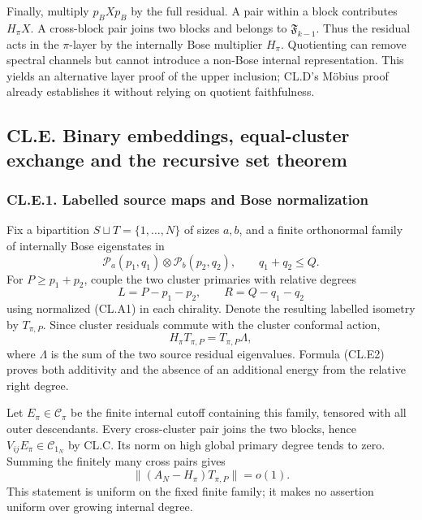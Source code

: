 \documentclass[a4paper,11pt]{article}
\numberwithin{equation}{section}
\begin{document}
Finally, multiply \(p_BXp_B\) by the full residual. A pair within a block contributes \(H_\pi X\). A cross-block pair joins two blocks and belongs to \(\mathfrak F_{k-1}\). Thus the residual acts in the \(\pi\)-layer by the internally Bose multiplier \(H_\pi\). Quotienting can remove spectral channels but cannot introduce a non-Bose internal representation. This yields an alternative layer proof of the upper inclusion; CL.D's Möbius proof already establishes it without relying on quotient faithfulness.

\hypertarget{cl.e.-binary-embeddings-equal-cluster-exchange-and-the-recursive-set-theorem}{%
\subsection{CL.E. Binary embeddings, equal-cluster exchange and the recursive set theorem}\label{cl.e.-binary-embeddings-equal-cluster-exchange-and-the-recursive-set-theorem}}

\hypertarget{cl.e.1.-labelled-source-maps-and-bose-normalization}{%
\subsubsection{CL.E.1. Labelled source maps and Bose normalization}\label{cl.e.1.-labelled-source-maps-and-bose-normalization}}

Fix a bipartition \(S\sqcup T=\{1,\ldots,N\}\) of sizes \(a,b\), and a finite orthonormal family of internally Bose eigenstates in \[
\mathcal P_a(p_1,q_1)\otimes\mathcal P_b(p_2,q_2),
\qquad q_1+q_2\leq Q.
\] For \(P\geq p_1+p_2\), couple the two cluster primaries with relative degrees \[
L=P-p_1-p_2,\qquad R=Q-q_1-q_2
\tag{CL.E1}
\] using normalized (CL.A1) in each chirality. Denote the resulting labelled isometry by \(T_{\pi,P}\). Since cluster residuals commute with the cluster conformal action, \[
H_\pi T_{\pi,P}=T_{\pi,P}\Lambda,
\tag{CL.E2}
\] where \(\Lambda\) is the sum of the two source residual eigenvalues. Formula (CL.E2) proves both additivity and the absence of an additional energy from the relative right degree.

Let \(E_\pi\in\mathcal C_\pi\) be the finite internal cutoff containing this family, tensored with all outer descendants. Every cross-cluster pair joins the two blocks, hence \(V_{ij}E_\pi\in\mathcal C_{1_N}\) by CL.C. Its norm on high global primary degree tends to zero. Summing the finitely many cross pairs gives \[
\|(A_N-H_\pi)T_{\pi,P}\|=o(1).
\tag{CL.E3}
\] This statement is uniform on the fixed finite family; it makes no assertion uniform over growing internal degree.
\end{document}
